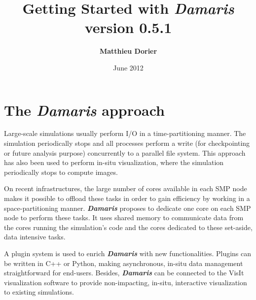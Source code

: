 \documentclass[11pt]{report}
\newcommand{\Damaris}{\emph{\textbf{Damaris}}}
\begin{document}
\title{\Huge{ 
	 Getting Started with \Damaris{}} \\
	\normalsize{} version 0.5.1}

\author{\textbf{Matthieu Dorier}}
\date{June 2012}
\maketitle

\setcounter{tocdepth}{1}
\tableofcontents

\chapter*{The \Damaris{} approach}

Large-scale simulations usually perform I/O in a time-partitioning manner.
The simulation periodically stops and all processes perform a write (for checkpointing
or future analysis purpose) concurrently to a parallel file system. This approach has also been
used to perform in-situ visualization, where the simulation periodically stops to compute images.

On recent infrastructures, the large number of cores available in each SMP node makes
it possible to offload these tasks in order to gain efficiency by working in a space-partitioning manner.
\Damaris{} proposes to dedicate one core on each SMP node to perform these tasks.
It uses shared memory to communicate data from the cores running the simulation's code and
the cores dedicated to these set-aside, data intensive tasks.

A plugin system is used to enrich \Damaris{} with new functionalities. Plugins can be written
in C++ or Python, making asynchronous, in-situ data management straightforward for end-users.
Besides, \Damaris{} can be connected to the VisIt visualization software to provide
non-impacting, in-situ, interactive visualization to existing simulations.



\end{document}
